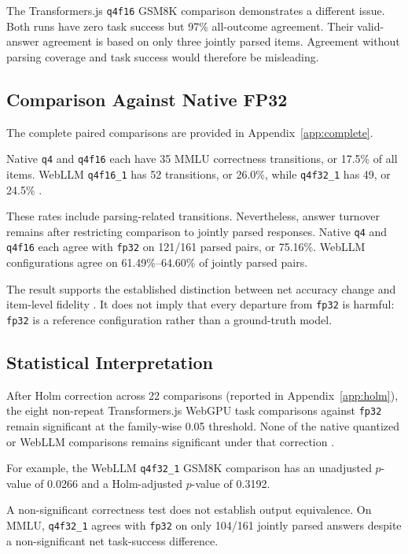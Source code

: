 \documentclass[conference]{IEEEtran}
\newcommand{\fp}{\texttt{fp32}}
\newcommand{\qfour}{\texttt{q4}}
\newcommand{\qfourhalf}{\texttt{q4f16}}
\newcommand{\mlchalf}{\texttt{q4f16\_1}}
\newcommand{\mlcfull}{\texttt{q4f32\_1}}
\begin{document}
The Transformers.js \qfourhalf{} GSM8K comparison demonstrates
a different issue. Both runs have zero task success but 97\%
all-outcome agreement.
Their valid-answer agreement is based on only three jointly
parsed items.
Agreement without parsing coverage and task success would
therefore be misleading.


\subsection{Comparison Against Native FP32}
\label{sec:reference}

The complete paired comparisons are provided in
Appendix~\ref{app:complete}.

Native \qfour{} and \qfourhalf{} each have 35 MMLU correctness
transitions, or 17.5\% of all items.
WebLLM \mlchalf{} has 52 transitions, or 26.0\%, while
\mlcfull{} has 49, or 24.5\% \cite{repository}.

These rates include parsing-related transitions.
Nevertheless, answer turnover remains after restricting
comparison to jointly parsed responses.
Native \qfour{} and \qfourhalf{} each agree with \fp{} on
121/161 parsed pairs, or 75.16\%.
WebLLM configurations agree on 61.49\%--64.60\% of jointly
parsed pairs.

The result supports the established distinction between
net accuracy change and item-level fidelity
\cite{accuracy}.
It does not imply that every departure from \fp{} is harmful:
\fp{} is a reference configuration rather than a
ground-truth model.


\subsection{Statistical Interpretation}
\label{sec:statistics}

After Holm correction across 22 comparisons (reported in
Appendix~\ref{app:holm}), the eight non-repeat Transformers.js
WebGPU task comparisons against \fp{} remain significant at
the family-wise 0.05 threshold. None of the native quantized
or WebLLM comparisons remains significant under that
correction \cite{repository}.

For example, the WebLLM \mlcfull{} GSM8K comparison has an
unadjusted $p$-value of 0.0266 and a Holm-adjusted $p$-value
of 0.3192.

A non-significant correctness test does not establish
output equivalence.
On MMLU, \mlcfull{} agrees with \fp{} on only 104/161 jointly
parsed answers despite a non-significant net task-success
difference.
\end{document}
